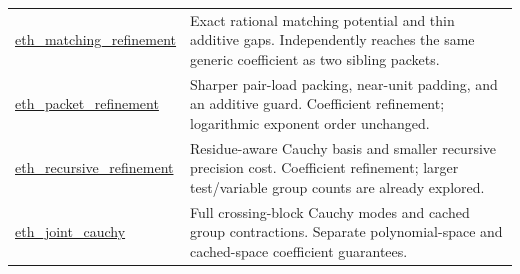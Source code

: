 \begin{longtable}{>{\raggedright\arraybackslash}p{4.9cm}>{\raggedright\arraybackslash}p{10cm}}
\href{https://github.com/VladimirReshetnikov/ProveIt/tree/8e76d515063c4b9fbd8743a846b457e3a01bc039/Computability/SubexponentialSAT/Research/eth_matching_refinement}{\textsf{eth\_\allowbreak matching\_\allowbreak refinement}} & Exact rational matching potential and thin additive gaps. Independently reaches the same generic coefficient as two sibling packets.\\[3pt]
\href{https://github.com/VladimirReshetnikov/ProveIt/tree/8e76d515063c4b9fbd8743a846b457e3a01bc039/Computability/SubexponentialSAT/Research/eth_packet_refinement}{\textsf{eth\_\allowbreak packet\_\allowbreak refinement}} & Sharper pair-load packing, near-unit padding, and an additive guard. Coefficient refinement; logarithmic exponent order unchanged.\\[3pt]
\href{https://github.com/VladimirReshetnikov/ProveIt/tree/8e76d515063c4b9fbd8743a846b457e3a01bc039/Computability/SubexponentialSAT/Research/eth_recursive_refinement}{\textsf{eth\_\allowbreak recursive\_\allowbreak refinement}} & Residue-aware Cauchy basis and smaller recursive precision cost. Coefficient refinement; larger test/variable group counts are already explored.\\[3pt]
\href{https://github.com/VladimirReshetnikov/ProveIt/tree/8e76d515063c4b9fbd8743a846b457e3a01bc039/Computability/SubexponentialSAT/Research/eth_joint_cauchy}{\textsf{eth\_\allowbreak joint\_\allowbreak cauchy}} & Full crossing-block Cauchy modes and cached group contractions. Separate polynomial-space and cached-space coefficient guarantees.\\[3pt]
\end{longtable}


